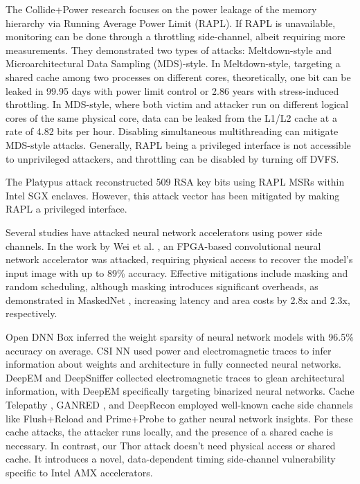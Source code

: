 The Collide+Power research focuses on the power leakage of the memory hierarchy via Running Average Power Limit (RAPL). If RAPL is unavailable, monitoring can be done through a throttling side-channel, albeit requiring more measurements. They demonstrated two types of attacks: Meltdown-style and Microarchitectural Data Sampling (MDS)-style. In Meltdown-style, targeting a shared cache among two processes on different cores, theoretically, one bit can be leaked in 99.95 days with power limit control or 2.86 years with stress-induced throttling. In MDS-style, where both victim and attacker run on different logical cores of the same physical core, data can be leaked from the L1/L2 cache at a rate of 4.82 bits per hour. Disabling simultaneous multithreading can mitigate MDS-style attacks. Generally, RAPL being a privileged interface is not accessible to unprivileged attackers, and throttling can be disabled by turning off DVFS.

The Platypus attack reconstructed 509 RSA key bits using RAPL MSRs within Intel SGX enclaves. However, this attack vector has been mitigated by making RAPL a privileged interface.

Several studies have attacked neural network accelerators using power side channels. In the work by Wei et al. \cite{wei2018know}, an FPGA-based convolutional neural network accelerator was attacked, requiring physical access to recover the model's input image with up to 89\% accuracy. Effective mitigations include masking and random scheduling, although masking introduces significant overheads, as demonstrated in MaskedNet \cite{dubey2020maskednet}, increasing latency and area costs by 2.8x and 2.3x, respectively.

Open DNN Box \cite{Xiang2019OpenDB} inferred the weight sparsity of neural network models with 96.5\% accuracy on average. CSI NN \cite{236204} used power and electromagnetic traces to infer information about weights and architecture in fully connected neural networks. DeepEM \cite{Yu2020DeepEMDN} and DeepSniffer \cite{Hu2020DeepSnifferAD} collected electromagnetic traces to glean architectural information, with DeepEM specifically targeting binarized neural networks. Cache Telepathy \cite{244042}, GANRED \cite{Liu2020GANREDGR}, and DeepRecon \cite{Hong2018SecurityAO} employed well-known cache side channels like Flush+Reload and Prime+Probe to gather neural network insights. For these cache attacks, the attacker runs locally, and the presence of a shared cache is necessary. In contrast, our Thor attack doesn't need physical access or shared cache. It introduces a novel, data-dependent timing side-channel vulnerability specific to Intel AMX accelerators.

